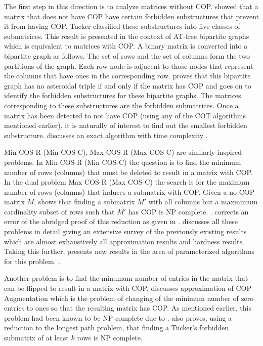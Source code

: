 \documentclass[MS,]{iitmdiss}
\begin{document}
The first step in this direction is to analyze matrices without
COP. \cite{at72} showed that a matrix that does not have COP have
certain forbidden substructures that prevent it from having
COP. Tucker classified these substructures into five classes of
submatrices. This result is presented in the context of AT-free
bipartite graphs  which
is equivalent to matrices with COP. A binary matrix is converted into
a bipartite graph as follows. The set of rows and the set of columns
form the two partitions of the graph. Each row node is adjacent to
those nodes that represent the columns that have ones in the
corresponding row. \cite{at72} proves that this bipartite graph has no
asteroidal triple if and only if the matrix has COP and goes on to
identify the forbidden substructures for these bipartite graphs. The
matrices corresponding to these substructures are the forbidden
submatrices. Once a matrix has been detected to not have COP (using
any of the COT algorithms mentioned earlier), it is naturally of
interest to find out the smallest
forbidden substructure. \cite{d08phd} discusses an exact algorithm
with time complexity .  

{\sc Min COS-R (Min COS-C), Max COS-R (Max COS-C)} are similarly
inspired problems. In {\sc Min COS-R (Min COS-C)} the question is to
find the minimum number of rows (columns) that must be deleted to
result in a matrix with COP.  In the dual problem {\sc Max COS-R (Max
  COS-C)} the search is for the maximum number of rows (columns) that
induces a submatrix with COP. Given a no-COP matrix $M$,
\cite{b75-phd} shows that finding a submatrix $M'$ with all columns
but a maxmimum cardinality subset of rows such that $M'$ has COP is NP
complete. . \cite{hg02} corrects an error of the abridged proof
of this reduction as given in \cite{gj79}.  \cite{d08phd} discusses
all these problems in detail giving an extensive survey of the
previously existing results which are almost exhaustively all
approximation results and hardness results. Taking this further,
\cite{d08phd} presents new results in the area of parameterized
algorithms for this problem. .


Another problem is to find the minumum number of entries in the matrix
that can be flipped to result in a matrix with COP.  \cite{v85}
discusses approximation of {\sc COP Augmentation} which is the problem
of changing of the minimum number of zero entries to ones so that the
resulting matrix has COP. As mentioned earlier, this problem had been known
to be NP complete due to \cite{b75-phd}. \cite{v85} also proves, using
a reduction to the longest path problem,  that finding a Tucker's forbidden
submatrix of at least $k$
rows is NP complete.  \\
\end{document}
